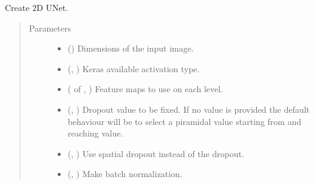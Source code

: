 \documentclass[letterpaper,10pt,english]{sphinxmanual}
\begin{document}
\begin{fulllineitems}
\label{\detokenize{models/unet:models.unet.U_Net_2D}}
Create 2D U\sphinxhyphen{}Net.
\begin{quote}\begin{description}
\item[{Parameters}] \leavevmode\begin{itemize}
\item {} 
 () \textendash{} Dimensions of the input image.

\item {} 
 (, ) \textendash{} Keras available activation type.

\item {} 
 ( of , ) \textendash{} Feature maps to use on each level.

\item {} 
 (, ) \textendash{} Dropout value to be fixed. If no value is provided the default behaviour will be to select a piramidal value
starting from  and reaching  value.

\item {} 
 (, ) \textendash{} Use spatial dropout instead of the  dropout.

\item {} 
 (, ) \textendash{} Make batch normalization.


\end{itemize}
\end{description}
\end{quote}
\end{fulllineitems}
\end{document}

